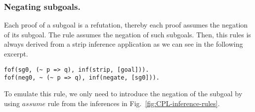 \documentclass[../../main.tex]{subfiles}
\begin{document}
\subsubsection{Negating subgoals.}
\label{sssec:negate}

Each proof of a subgoal is a refutation, thereby each proof assumes
the negation of its subgoal.
The \negate rule assumes the negation of such subgoals. Then, this rules
is always derived from a strip inference application as we can see in 
the following \TSTP excerpt.

\begin{verbatim}
fof(sg0, (~ p => q), inf(strip, [goal])).
fof(neg0, ~ (~ p => q), inf(negate, [sg0])).
\end{verbatim}

To emulate this rule, we only need to introduce the negation
of the subgoal by using $assume$ rule from the inferences in
Fig.~\ref{fig:CPL-inference-rules}.
\end{document}

